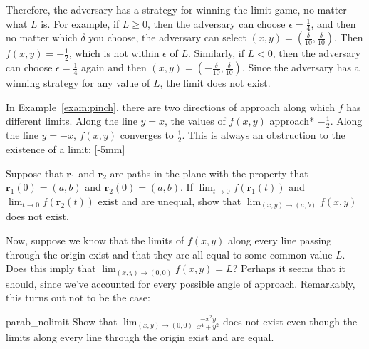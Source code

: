 \documentclass{watsonbook}
\begin{document}
\begin{solution}
  Therefore, the adversary has a strategy for winning the limit game,
  no matter what $L$ is. For example, if $L \geq 0$, then the
  adversary can choose $\epsilon = \tfrac{1}{4}$, and then no matter
  which $\delta$ you choose, the adversary can select
  $(x,y) = (\frac{\delta}{10}, \frac{\delta}{10})$. Then
  $f(x,y) = -\tfrac{1}{2}$, which is not within $\epsilon$ of
  $L$. Similarly, if $L < 0$, then the adversary can choose
  $\epsilon = \tfrac{1}{4}$ again and then
  $(x,y) = (-\frac{\delta}{10}, \frac{\delta}{10})$. Since the
  adversary has a winning strategy for any value of $L$, the limit
  does not exist.
\end{solution}

In Example~\ref{exam:pinch}, there are two directions of approach
along which $f$ has different limits. Along the line $y = x$, the
values of $f(x,y)$ approach* $-\tfrac{1}{2}$. Along the line $y = -x$,
$f(x,y)$ converges to $\tfrac{1}{2}$. This is always an obstruction to
the existence of a limit: [-5mm]

\begin{exercise}{}{}
  Suppose that $\mathbf{r}_1$ and $\mathbf{r}_2$ are paths in the
  plane with the property that $\mathbf{r}_1(0) = (a,b)$ and
  $\mathbf{r}_2(0) = (a,b)$. If $\lim_{t \to 0}f(\mathbf{r}_1(t))$ and
  $\lim_{t \to 0}f(\mathbf{r}_2(t))$ exist and are unequal, show that 
  $\displaystyle{\lim_{(x,y) \to (a,b)} f(x,y)}$ does not exist. 
\end{exercise} \bang{-1.5cm}

Now, suppose we know that the limits of $f(x,y)$ along every line
passing through the origin exist and that they are all equal to some
common value $L$. Does this imply that
$\lim_{(x,y) \to (0,0)}f(x,y) = L$? Perhaps it seems that it should,
since we've accounted for every possible angle of
approach. Remarkably, this turns out not to be the case:

\begin{example}{}{parab_nolimit}
  Show that $\lim_{(x,y) \to (0,0)}\frac{-x^2 y }{x^4 + y^2}$ does not
  exist even though the limits along every line through the origin
  exist and are equal. 
\end{example}
\end{document}
